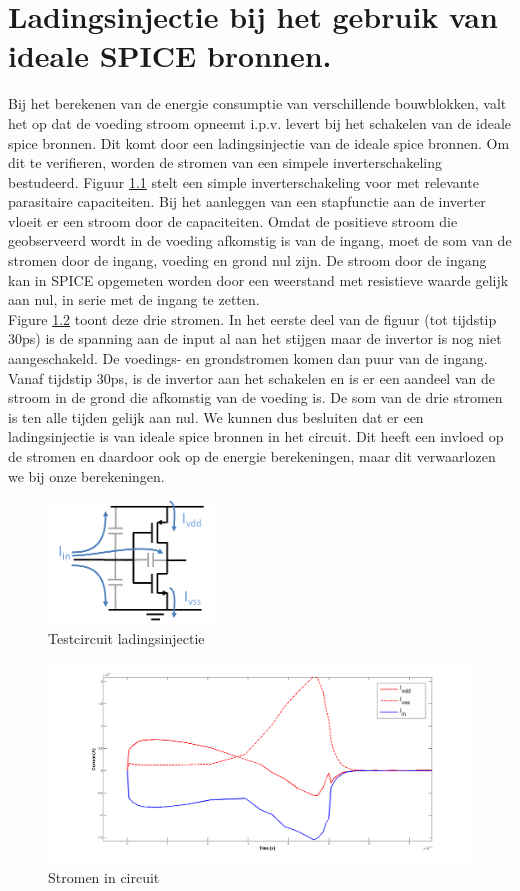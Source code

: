 \chapter{Ladingsinjectie bij het gebruik van ideale SPICE bronnen.}
\label{app:chargeinj}
Bij het berekenen van de energie consumptie van verschillende bouwblokken, valt het op dat de voeding stroom opneemt i.p.v. levert bij het schakelen van de ideale spice bronnen. Dit komt door een ladingsinjectie van de ideale spice bronnen. Om dit te verifieren, worden de stromen van een simpele inverterschakeling bestudeerd. Figuur \ref{fig:chargeinj_inv} stelt een simple inverterschakeling voor met relevante parasitaire capaciteiten. Bij het aanleggen van een stapfunctie aan de inverter vloeit er een stroom door de capaciteiten. Omdat de positieve stroom die geobserveerd wordt in de voeding afkomstig is van de ingang, moet de som van de stromen door de ingang, voeding en grond nul zijn. De stroom door de ingang kan in SPICE opgemeten worden door een weerstand met resistieve waarde gelijk aan nul, in serie met de ingang te zetten.\\
Figure \ref{fig:chargeinj_cur} toont deze drie stromen. In het eerste deel van de figuur (tot tijdstip 30ps) is de spanning aan de input al aan het stijgen maar de invertor is nog niet aangeschakeld. De voedings- en grondstromen komen dan puur van de ingang. Vanaf tijdstip 30ps, is de invertor aan het schakelen en is er een aandeel van de stroom in de grond die afkomstig van de voeding is. De som van de drie stromen is ten alle tijden gelijk aan nul.
We kunnen dus besluiten dat er een ladingsinjectie is van ideale spice bronnen in het circuit. Dit heeft een invloed op de stromen en daardoor ook op de energie berekeningen, maar dit verwaarlozen we bij onze berekeningen.

\begin{figure}[!ht]
  \centering
  \includegraphics[width=0.4\textwidth]{../fig/hfdst-chargeinj-inv.png}
  \caption[Ladingsinjectie: testcircuit]{Testcircuit ladingsinjectie}
  \label{fig:chargeinj_inv}
\end{figure}

\begin{figure}[!ht]
  \centering
  \includegraphics[width=\textwidth]{../fig/hfdst-chargeinj-currents.png}
  \caption[Ladingsinjectie: stroom]{Stromen in circuit}
  \label{fig:chargeinj_cur}
\end{figure}
